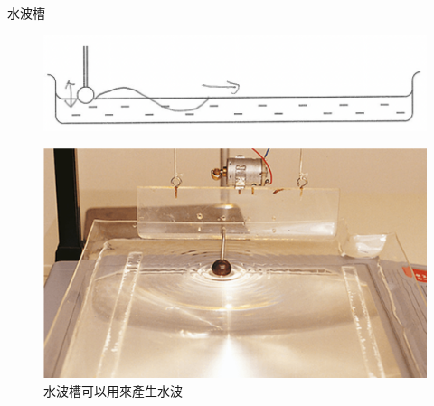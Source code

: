 \documentclass[13pt]{beamer}
\begin{document}
\begin{frame}{}
\begin{mmchoices}
        \item {}

    \end{mmchoices}
\end{frame}




\begin{frame}{水波槽}

    \begin{figure}
        \centering
        \includegraphics[width=0.5\linewidth]{images/Screenshot 2023-09-25 at 2.25.17 AM.png}
    \end{figure}
    \begin{figure}
        \centering
        \includegraphics[width=0.5\linewidth]{images/Picture 1.png}
        \caption{水波槽可以用來產生水波}

    \end{figure}
\end{frame}
\end{document}
